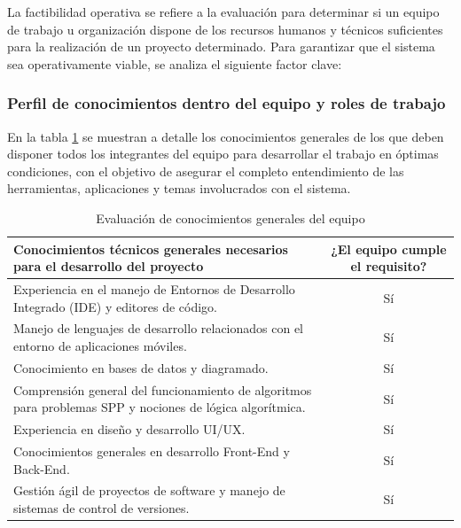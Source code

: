 
La factibilidad operativa se refiere a la evaluación para determinar si un equipo de trabajo u organización dispone de los recursos humanos y técnicos suficientes para la realización de un proyecto determinado. Para garantizar que el sistema sea operativamente viable, se analiza el siguiente factor clave:

\subsubsection{Perfil de conocimientos dentro del equipo y roles de trabajo}

En la tabla \ref{tab:conoc_generales} se muestran a detalle los conocimientos generales de los que deben disponer todos los integrantes del equipo para desarrollar el trabajo en óptimas condiciones, con el objetivo de asegurar el completo entendimiento de las herramientas, aplicaciones y temas involucrados con el sistema. 

\begin{table}[htbp]
\centering
\caption{Evaluación de conocimientos generales del equipo}
\label{tab:conoc_generales}
\begin{tabular}{| >{\centering\arraybackslash}m{} | c |}
\hline
\textbf{Conocimientos técnicos generales necesarios para el desarrollo del proyecto} & \textbf{¿El equipo cumple el requisito?} \\ \hline
Experiencia en el manejo de Entornos de Desarrollo Integrado (IDE) y editores de código. & Sí \\ \hline
Manejo de lenguajes de desarrollo relacionados con el entorno de aplicaciones móviles. & Sí \\ \hline
Conocimiento en bases de datos y diagramado. & Sí \\ \hline
Comprensión general del funcionamiento de algoritmos para problemas SPP y nociones de lógica algorítmica. & Sí \\ \hline
Experiencia en diseño y desarrollo UI/UX. & Sí \\ \hline
Conocimientos generales en desarrollo Front-End y Back-End. & Sí \\ \hline
Gestión ágil de proyectos de software y manejo de sistemas de control de versiones. & Sí \\ \hline
\end{tabular}
\end{table}


